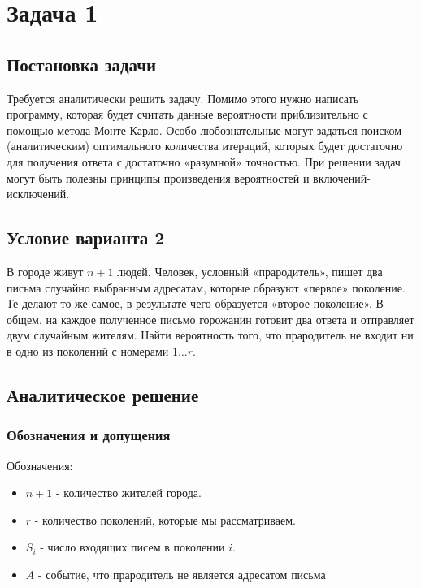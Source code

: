 \documentclass[a4paper,14pt]{extarticle}
\begin{document}
    \section*{Задача 1}
        
        \subsection*{Постановка задачи}
            
            Требуется аналитически решить задачу. Помимо этого нужно написать программу, которая будет считать данные вероятности приблизительно с помощью метода Монте-Карло. Особо любознательные могут задаться поиском (аналитическим) оптимального количества итераций, которых будет достаточно для получения ответа с достаточно «разумной» точностью. При решении задач могут быть полезны принципы произведения вероятностей и включений-исключений.
        
        \subsection*{Условие варианта 2}
            
            В городе живут \( n + 1 \) людей. Человек, условный «прародитель», пишет два письма случайно выбранным адресатам, которые образуют «первое» поколение. Те делают то же самое, в результате чего образуется «второе поколение». В общем, на каждое полученное письмо горожанин готовит два ответа и отправляет двум случайным жителям. Найти вероятность того, что прародитель не входит ни в одно из поколений с номерами \( 1 \ldots r \).
        
        \subsection*{Аналитическое решение}
            
            \subsubsection*{Обозначения и допущения}
                
                Обозначения:
                \begin{itemize}
                    \item \( n + 1 \) - количество жителей города.
                    \item \( r \) - количество поколений, которые мы рассматриваем.
                    \item \( S_i \) - число входящих писем в поколении \( i \).
                    \item \( A \) - событие, что прародитель не является адресатом письма
                \end{itemize}
                
\end{document}
